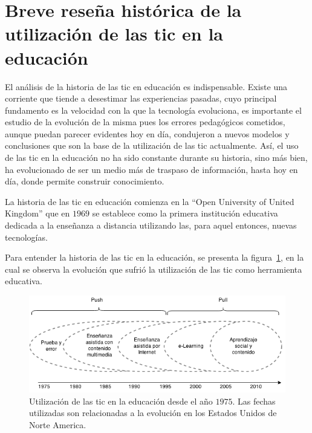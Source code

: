\section[Breve reseña histórica]{Breve reseña histórica de la utilización de las
    \gls{tic} en la educación}

El análisis de la historia de las \Gls{tic} en educación es
indispensable\cite{mcdougall2006theory}. Existe una corriente que tiende a
desestimar las experiencias pasadas, cuyo principal fundamento es la velocidad
con la que la tecnología evoluciona, es importante el estudio de la evolución de
la misma pues los errores pedagógicos cometidos, aunque puedan parecer evidentes
hoy en día, condujeron a nuevos modelos y conclusiones que son la base de la
utilización de las \Gls{tic} actualmente\cite{mcdougall2006theory}. Así, el uso
de las \Gls{tic} en la educación no ha sido constante durante su historia, sino
más bien, ha evolucionado de ser un medio más de traspaso de información, hasta
hoy en día, donde permite construir conocimiento\cite{tinio:ict}.

La historia de las \Gls{tic} en educación comienza en la \enquote{Open
    University of United Kingdom} que en $1969$ se establece como la primera
institución educativa dedicada a la enseñanza a distancia utilizando las, para
aquel entonces, nuevas tecnologías\cite{tinio:ict}.

Para entender la historia de las \Gls{tic} en la educación, se presenta la
figura~\ref{fig:history_tics}, en la cual se observa la evolución que sufrió la
utilización de las \Gls{tic} como herramienta educativa. 

\begin{figure}[h]
\centering
\includegraphics[scale=0.75]{tics/images/tics_history.png}
\caption{Utilización de las \Gls{tic} en la educación desde el año $1975$. Las
    fechas utilizadas son relacionadas a la evolución en los Estados Unidos de
    Norte America.}
\label{fig:history_tics}
\end{figure}



